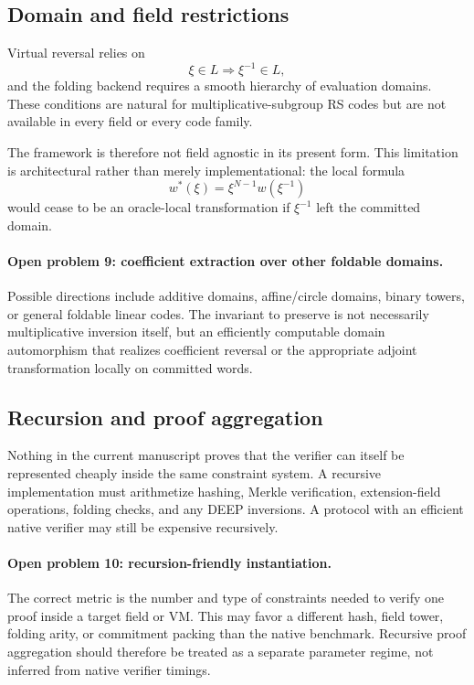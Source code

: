 \subsection{Domain and field restrictions}
\label{sec:limitations-domain}

Virtual reversal relies on
\[
  \xi\in L\Longrightarrow \xi^{-1}\in L,
\]
and the folding backend requires a smooth hierarchy of evaluation domains.  These conditions are natural for multiplicative-subgroup RS codes but are not available in every field or every code family.

The framework is therefore not field agnostic in its present form.  This limitation is architectural rather than merely implementational: the local formula
\[
  w^*(\xi)=\xi^{N-1}w(\xi^{-1})
\]
would cease to be an oracle-local transformation if $\xi^{-1}$ left the committed domain.

\paragraph{Open problem 9: coefficient extraction over other foldable domains.}
Possible directions include additive domains, affine/circle domains, binary towers, or general foldable linear codes.  The invariant to preserve is not necessarily multiplicative inversion itself, but an efficiently computable domain automorphism that realizes coefficient reversal or the appropriate adjoint transformation locally on committed words.

\subsection{Recursion and proof aggregation}
\label{sec:limitations-recursion}

Nothing in the current manuscript proves that the verifier can itself be represented cheaply inside the same constraint system.  A recursive implementation must arithmetize hashing, Merkle verification, extension-field operations, folding checks, and any DEEP inversions.  A protocol with an efficient native verifier may still be expensive recursively.

\paragraph{Open problem 10: recursion-friendly instantiation.}
The correct metric is the number and type of constraints needed to verify one proof inside a target field or VM.  This may favor a different hash, field tower, folding arity, or commitment packing than the native benchmark.  Recursive proof aggregation should therefore be treated as a separate parameter regime, not inferred from native verifier timings.

